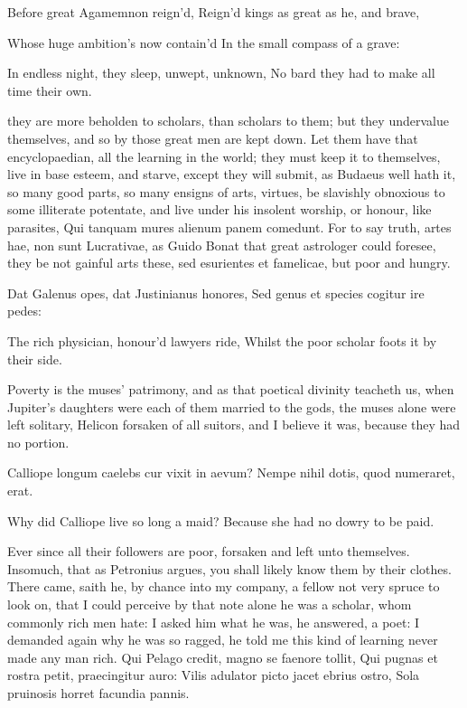 {Before great Agamemnon reign'd,
Reign'd kings as great as he, and brave,

Whose huge ambition's now contain'd
In the small compass of a grave:

In endless night, they sleep, unwept, unknown,
No bard they had to make all time their own.

they are more beholden to scholars, than scholars to them; but they
undervalue themselves, and so by those great men are kept down. Let
them have that encyclopaedian, all the learning in the world; they must
keep it to themselves, live in base esteem, and starve, except
they will submit, as Budaeus well hath it, so many good parts, so many
ensigns of arts, virtues, be slavishly obnoxious to some illiterate
potentate, and live under his insolent worship, or honour, like
parasites, Qui tanquam mures alienum panem comedunt. For to say truth,
artes hae, non sunt Lucrativae, as Guido Bonat that great astrologer
could foresee, they be not gainful arts these, sed esurientes et
famelicae, but poor and hungry.

Dat Galenus opes, dat Justinianus honores,
Sed genus et species cogitur ire pedes:


The rich physician, honour'd lawyers ride,
Whilst the poor scholar foots it by their side.

Poverty is the muses' patrimony, and as that poetical divinity teacheth
us, when Jupiter's daughters were each of them married to the gods, the
muses alone were left solitary, Helicon forsaken of all suitors, and I
believe it was, because they had no portion.

Calliope longum caelebs cur vixit in aevum?
Nempe nihil dotis, quod numeraret, erat.


Why did Calliope live so long a maid?
Because she had no dowry to be paid.

Ever since all their followers are poor, forsaken and left unto
themselves. Insomuch, that as Petronius argues, you shall likely
know them by their clothes. There came, saith he, by chance into my
company, a fellow not very spruce to look on, that I could perceive by
that note alone he was a scholar, whom commonly rich men hate: I asked
him what he was, he answered, a poet: I demanded again why he was so
ragged, he told me this kind of learning never made any man rich.
Qui Pelago credit, magno se faenore tollit,
Qui pugnas et rostra petit, praecingitur auro:
Vilis adulator picto jacet ebrius ostro,
Sola pruinosis horret facundia pannis.


}
